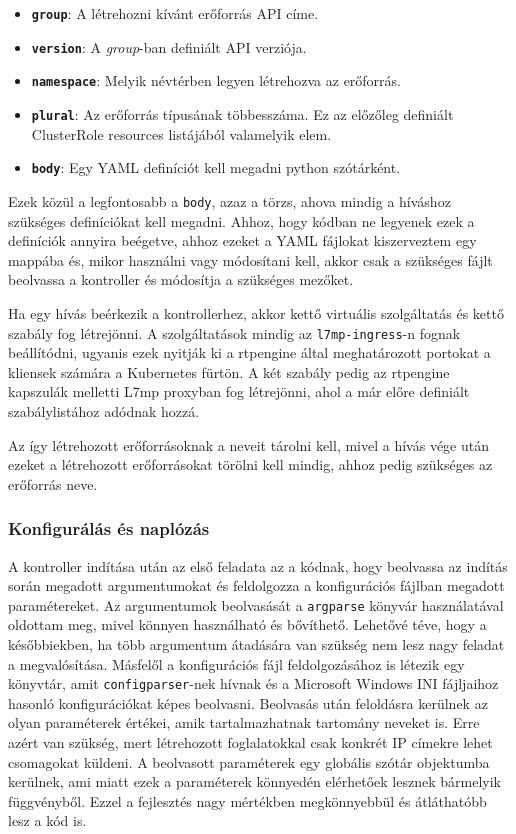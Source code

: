 \begin{itemize}
	\item \textbf{\texttt{group}}: A létrehozni kívánt erőforrás API címe.  
	\item \textbf{\texttt{version}}: A \textit{group}-ban definiált API verziója. 
	\item \textbf{\texttt{namespace}}: Melyik névtérben legyen létrehozva az erőforrás.
	\item \textbf{\texttt{plural}}: Az erőforrás típusának többesszáma. Ez az előzőleg 
	definiált ClusterRole resources listájából valamelyik elem. 
	\item \textbf{\texttt{body}}: Egy YAML definíciót kell megadni python szótárként. 
\end{itemize}

Ezek közül a legfontosabb a \texttt{body}, azaz a törzs, ahova mindig a híváshoz 
szükséges definíciókat kell megadni. Ahhoz, hogy kódban ne legyenek ezek a definíciók 
annyira beégetve, ahhoz ezeket a YAML fájlokat kiszerveztem egy mappába és, mikor 
használni vagy módosítani kell, akkor csak a szükséges fájlt beolvassa a kontroller és 
módosítja a szükséges mezőket.

Ha egy hívás beérkezik a kontrollerhez, akkor kettő virtuális szolgáltatás és kettő
szabály fog létrejönni. A szolgáltatások mindig az \texttt{l7mp-ingress}-n fognak 
beállítódni, ugyanis ezek nyitják ki a rtpengine által meghatározott portokat a kliensek 
számára a Kubernetes fürtön. A két szabály pedig az rtpengine kapszulák melletti L7mp 
proxyban fog létrejönni, ahol a már előre definiált szabálylistához adódnak hozzá. 

Az így létrehozott erőforrásoknak a neveit tárolni kell, mivel a hívás vége után ezeket
a létrehozott erőforrásokat törölni kell mindig, ahhoz pedig szükséges az erőforrás 
neve. 

\subsubsection{Konfigurálás és naplózás}

A kontroller indítása után az első feladata az a kódnak, hogy beolvassa az indítás
során megadott argumentumokat és feldolgozza a konfigurációs fájlban megadott 
paramétereket. Az argumentumok beolvasását a \texttt{argparse} \cite{argparse} könyvár 
használatával oldottam meg, mivel könnyen használható és bővíthető. Lehetővé téve, hogy a
későbbiekben, ha több argumentum átadására van szükség nem lesz nagy feladat a 
megvalósítása. Másfelől a konfigurációs fájl feldolgozásához is létezik egy könyvtár, 
amit \texttt{configparser}-nek \cite{configparser} hívnak és a Microsoft Windows INI 
fájljaihoz hasonló konfigurációkat képes beolvasni. Beolvasás után feloldásra kerülnek az 
olyan paraméterek értékei, amik tartalmazhatnak tartomány neveket is. Erre azért van 
szükség, mert létrehozott foglalatokkal csak konkrét IP címekre lehet csomagokat küldeni. 
A beolvasott paraméterek egy globális szótár objektumba kerülnek, ami miatt ezek a 
paraméterek könnyedén elérhetőek lesznek bármelyik függvényből. Ezzel a fejlesztés nagy 
mértékben megkönnyebbül és átláthatóbb lesz a kód is.

